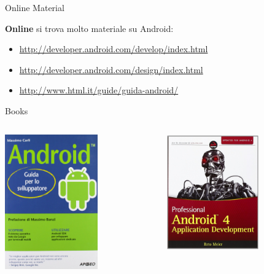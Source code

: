\documentclass[xcolor=svgnames,11pt]{beamer}
\begin{document}
\begin{frame}{Online Material}

\textbf{Online} si trova molto materiale su Android:
\pause
\medskip
\begin{itemize}
\item \small{\url{http://developer.android.com/develop/index.html}}
\pause
\item \url{http://developer.android.com/design/index.html}
\pause
\item \url{http://www.html.it/guide/guida-android/}
\end{itemize}
\end{frame}

\begin{frame}[fragile]{Books}

\begin{columns}
    \begin{column}{0.5\textwidth}
    \begin{center}
    \includegraphics[width=4cm]{carli.jpg}
    \end{center}
	\end{column}
	\begin{column}{0.5\textwidth}
	\begin{center}
    \includegraphics[width=4cm]{meier.jpg}
    \end{center}
	\end{column}
\end{columns}
\end{frame}
\end{document}
